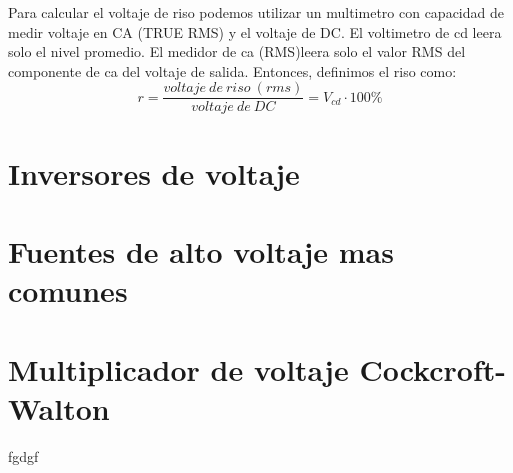 Para calcular el voltaje de riso podemos utilizar un multimetro con capacidad de medir voltaje en CA (TRUE RMS) y el voltaje de DC. El voltimetro de cd leera solo el nivel promedio. El medidor de ca (RMS)leera solo el valor RMS del componente de ca del voltaje de salida. Entonces, definimos el riso como:\\

\begin{equation}
r=\frac{voltaje\:  de\:  riso\:  (rms)}{voltaje\:  de\:  DC}=V_{cd}\cdot 100\%
\end{equation}

\newpage

\section{Inversores de voltaje}

\section{Fuentes de alto voltaje mas comunes}


\section{Multiplicador de voltaje Cockcroft-Walton}
fgdgf